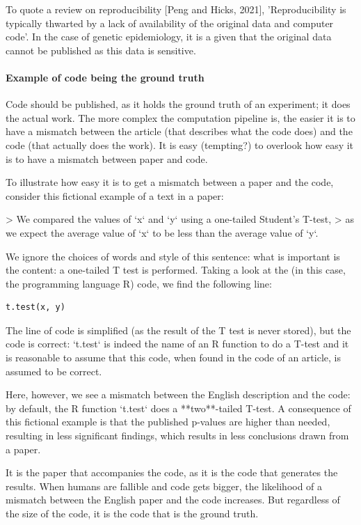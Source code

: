 To quote a review on reproducibility [Peng and Hicks, 2021], 
'Reproducibility is typically thwarted by a 
lack of availability of the original data and computer code'.
In the case of genetic epidemiology, it is a given that the original
data cannot be published as this data is sensitive.

\paragraph{Example of code being the ground truth}

Code should be published, as it holds the
ground truth of an experiment; it does the actual work.
The more complex the computation pipeline is, the easier it is
to have a mismatch between the article (that describes what the
code does) and the code (that actually does the work).
It is easy (tempting?) to overlook how easy it is to have a mismatch
between paper and code.

To illustrate how easy it is to get a mismatch between a paper
and the code, consider this fictional example
of a text in a paper:

> We compared the values of `x` and `y` using a one-tailed Student's T-test,
> as we expect the average value of `x` to be less than the average value of `y`.

We ignore the choices of words and style of this sentence: what is
important is the content: a one-tailed T test is performed.
Taking a look at the (in this case, the programming language R) code, 
we find the following line:

\begin{verbatim}
t.test(x, y)
\end{verbatim}

The line of code is simplified (as the result of the T test is never stored),
but the code is correct: 
`t.test` is indeed the name of an R function to do a T-test
and it is reasonable to assume that this code, when found in the code
of an article, is assumed to be correct.

Here, however, we see a mismatch between the English description and the code:
by default, the R function `t.test` does a **two**-tailed T-test.
A consequence of this fictional example is that the published p-values are
higher than needed, resulting in less significant findings, which
results in less conclusions drawn from a paper.

It is the paper that accompanies the code,
as it is the code that generates the results.
When humans are fallible and code gets bigger, the likelihood of
a mismatch between the English paper and the code increases.
But regardless of the size of the code, 
it is the code that is the ground truth.

